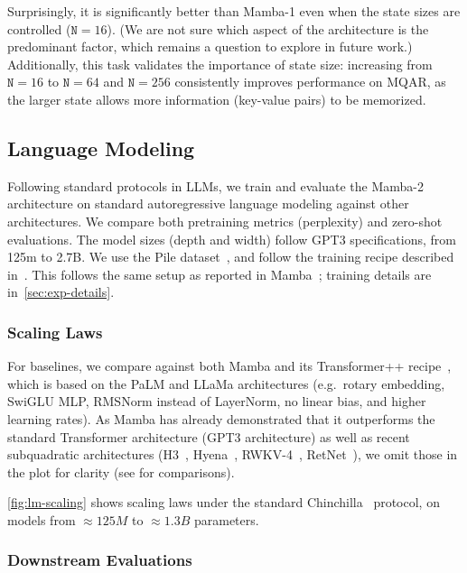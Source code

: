 Surprisingly, it is significantly better than Mamba-1 even when the state sizes are controlled ($\mathtt{N}=16$).
(We are not sure which aspect of the architecture is the predominant factor, which remains a question to explore in future work.) Additionally, this task validates the importance of state size: increasing from $\mathtt{N}=16$ to $\mathtt{N}=64$ and $\mathtt{N}=256$ consistently improves performance on MQAR, as the larger state allows more information (key-value pairs) to be memorized.

\subsection{Language Modeling}
\label{sec:experiments:lm}

Following standard protocols in LLMs, we train and evaluate the Mamba-2 architecture on standard autoregressive language modeling against other architectures. We compare both pretraining metrics (perplexity) and zero-shot evaluations. The model sizes (depth and width) follow GPT3 specifications, from 125m to 2.7B. We use the Pile dataset~\citep{pile}, and follow the training recipe described in~\citep{brown2020language}.
This follows the same setup as reported in Mamba~\citep{gu2023mamba};
training details are in~\ref{sec:exp-details}.

\subsubsection{Scaling Laws} For baselines, we compare against both Mamba and its Transformer++ recipe~\citep{gu2023mamba}, which is based on the PaLM and LLaMa architectures (e.g.\ rotary embedding, SwiGLU MLP, RMSNorm instead of LayerNorm, no linear bias, and higher learning rates). As Mamba has already demonstrated that it outperforms the standard Transformer architecture (GPT3 architecture) as well as recent subquadratic architectures (H3~\citep{dao2023hungry}, Hyena~\citep{poli2023hyena}, RWKV-4~\citep{peng2023rwkv}, RetNet~\citep{sun2023retentive}), we omit those in the plot for clarity (see \citep{gu2023mamba} for comparisons).

\ref{fig:lm-scaling} shows scaling laws under the standard Chinchilla~\citep{hoffmann2022empirical} protocol, on models from $\approx 125M$ to $\approx 1.3B$ parameters.

\subsubsection{Downstream Evaluations}

